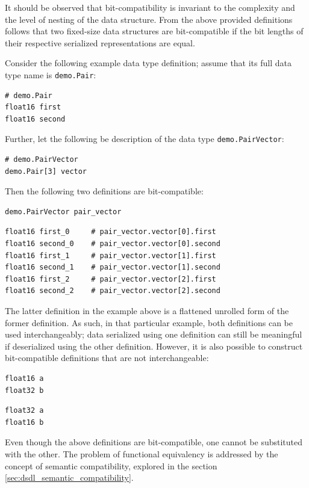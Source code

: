 It should be observed that bit-compatibility is invariant to the complexity and the level of nesting
of the data structure.
From the above provided definitions follows that two fixed-size data structures are bit-compatible if the
bit lengths of their respective serialized representations are equal.

Consider the following example data type definition; assume that its full data type name is
\verb|demo.Pair|:

\begin{verbatim}
# demo.Pair
float16 first
float16 second
\end{verbatim}

Further, let the following be description of the data type \verb|demo.PairVector|:

\begin{verbatim}
# demo.PairVector
demo.Pair[3] vector
\end{verbatim}

Then the following two definitions are bit-compatible:

\begin{verbatim}
demo.PairVector pair_vector
\end{verbatim}

\begin{verbatim}
float16 first_0     # pair_vector.vector[0].first
float16 second_0    # pair_vector.vector[0].second
float16 first_1     # pair_vector.vector[1].first
float16 second_1    # pair_vector.vector[1].second
float16 first_2     # pair_vector.vector[2].first
float16 second_2    # pair_vector.vector[2].second
\end{verbatim}

The latter definition in the example above is a flattened unrolled form of the former definition.
As such, in that particular example, both definitions can be used interchangeably;
data serialized using one definition can still be meaningful if deserialized using the other definition.
However, it is also possible to construct bit-compatible definitions that are not interchangeable:

\begin{verbatim}
float16 a
float32 b
\end{verbatim}

\begin{verbatim}
float32 a
float16 b
\end{verbatim}

Even though the above definitions are bit-compatible, one cannot be substituted with the other.
The problem of functional equivalency is addressed by the concept of semantic compatibility,
explored in the section \ref{sec:dsdl_semantic_compatibility}.

